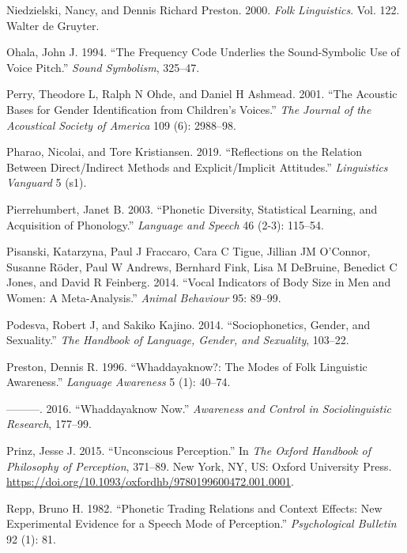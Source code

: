 \documentclass[
  letterpaper,
  DIV=11,
  numbers=noendperiod]{scrartcl}
\newlength{\cslhangindent}
\newenvironment{CSLReferences}[2] %
 {\begin{list}{}{%
  \setlength{\itemindent}{0pt}
  \setlength{\leftmargin}{0pt}
  \setlength{\parsep}{0pt}
  \ifodd #1
   \setlength{\leftmargin}{\cslhangindent}
   \setlength{\itemindent}{-1\cslhangindent}
  \fi
  \setlength{\itemsep}{#2\baselineskip}}}
 {\end{list}}
\begin{document}
\begin{CSLReferences}{1}{0}
Niedzielski, Nancy, and Dennis Richard Preston. 2000. \emph{Folk
Linguistics}. Vol. 122. Walter de Gruyter.

Ohala, John J. 1994. {``The Frequency Code Underlies the Sound-Symbolic
Use of Voice Pitch.''} \emph{Sound Symbolism}, 325--47.

Perry, Theodore L, Ralph N Ohde, and Daniel H Ashmead. 2001. {``The
Acoustic Bases for Gender Identification from Children's Voices.''}
\emph{The Journal of the Acoustical Society of America} 109 (6):
2988--98.

Pharao, Nicolai, and Tore Kristiansen. 2019. {``Reflections on the
Relation Between Direct/Indirect Methods and Explicit/Implicit
Attitudes.''} \emph{Linguistics Vanguard} 5 (s1).

Pierrehumbert, Janet B. 2003. {``Phonetic Diversity, Statistical
Learning, and Acquisition of Phonology.''} \emph{Language and Speech} 46
(2-3): 115--54.

Pisanski, Katarzyna, Paul J Fraccaro, Cara C Tigue, Jillian JM O'Connor,
Susanne Röder, Paul W Andrews, Bernhard Fink, Lisa M DeBruine, Benedict
C Jones, and David R Feinberg. 2014. {``Vocal Indicators of Body Size in
Men and Women: A Meta-Analysis.''} \emph{Animal Behaviour} 95: 89--99.

Podesva, Robert J, and Sakiko Kajino. 2014. {``Sociophonetics, Gender,
and Sexuality.''} \emph{The Handbook of Language, Gender, and
Sexuality}, 103--22.

Preston, Dennis R. 1996. {``Whaddayaknow?: The Modes of Folk Linguistic
Awareness.''} \emph{Language Awareness} 5 (1): 40--74.

---------. 2016. {``Whaddayaknow Now.''} \emph{Awareness and Control in
Sociolinguistic Research}, 177--99.

Prinz, Jesse J. 2015. {``Unconscious Perception.''} In \emph{The
{Oxford} Handbook of Philosophy of Perception}, 371--89. New York, NY,
US: Oxford University Press.
\url{https://doi.org/10.1093/oxfordhb/9780199600472.001.0001}.

Repp, Bruno H. 1982. {``Phonetic Trading Relations and Context Effects:
New Experimental Evidence for a Speech Mode of Perception.''}
\emph{Psychological Bulletin} 92 (1): 81.


\end{CSLReferences}
\end{document}
